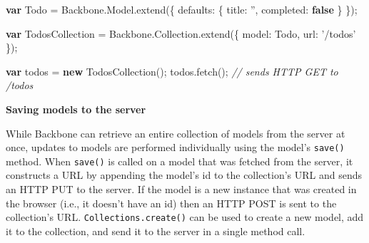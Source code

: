 \documentclass[9pt]{book}
\newenvironment{Shaded}{}{}
\newcommand{\KeywordTok}[1]{\textcolor[rgb]{0.00,0.44,0.13}{\textbf{{#1}}}}
\newcommand{\DataTypeTok}[1]{\textcolor[rgb]{0.56,0.13,0.00}{{#1}}}
\newcommand{\StringTok}[1]{\textcolor[rgb]{0.25,0.44,0.63}{{#1}}}
\newcommand{\CommentTok}[1]{\textcolor[rgb]{0.38,0.63,0.69}{\textit{{#1}}}}
\newcommand{\OtherTok}[1]{\textcolor[rgb]{0.00,0.44,0.13}{{#1}}}
\newcommand{\FunctionTok}[1]{\textcolor[rgb]{0.02,0.16,0.49}{{#1}}}
\newcommand{\NormalTok}[1]{{#1}}
\begin{document}
\begin{Shaded}
\begin{Highlighting}[]
\KeywordTok{var} \NormalTok{Todo = }\OtherTok{Backbone}\NormalTok{.}\OtherTok{Model}\NormalTok{.}\FunctionTok{extend}\NormalTok{(\{}
  \DataTypeTok{defaults}\NormalTok{: \{}
    \DataTypeTok{title}\NormalTok{: }\StringTok{''}\NormalTok{,}
    \DataTypeTok{completed}\NormalTok{: }\KeywordTok{false}
  \NormalTok{\}}
\NormalTok{\});}

\KeywordTok{var} \NormalTok{TodosCollection = }\OtherTok{Backbone}\NormalTok{.}\OtherTok{Collection}\NormalTok{.}\FunctionTok{extend}\NormalTok{(\{}
  \DataTypeTok{model}\NormalTok{: Todo,}
  \DataTypeTok{url}\NormalTok{: }\StringTok{'/todos'}
\NormalTok{\});}

\KeywordTok{var} \NormalTok{todos = }\KeywordTok{new} \FunctionTok{TodosCollection}\NormalTok{();}
\OtherTok{todos}\NormalTok{.}\FunctionTok{fetch}\NormalTok{(); }\CommentTok{// sends HTTP GET to /todos}
\end{Highlighting}
\end{Shaded}

\textbf{Saving models to the server}

While Backbone can retrieve an entire collection of models from the
server at once, updates to models are performed individually using the
model's \texttt{save()} method. When \texttt{save()} is called on a
model that was fetched from the server, it constructs a URL by appending
the model's id to the collection's URL and sends an HTTP PUT to the
server. If the model is a new instance that was created in the browser
(i.e., it doesn't have an id) then an HTTP POST is sent to the
collection's URL. \texttt{Collections.create()} can be used to create a
new model, add it to the collection, and send it to the server in a
single method call.
\end{document}
